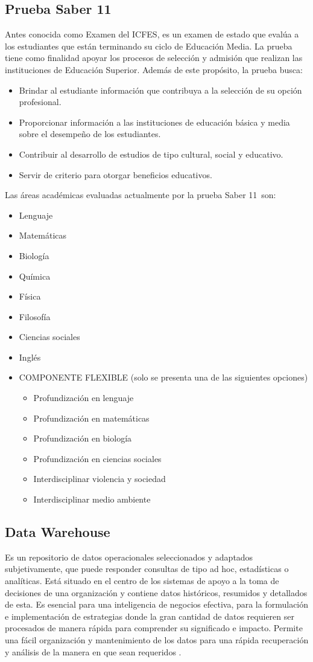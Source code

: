 \subsection{Prueba Saber 11\degree}\label{sec:saber11}
Antes conocida como Examen del ICFES, es un examen de estado que evalúa a los estudiantes que están terminando su ciclo de Educación Media. La prueba tiene como finalidad apoyar los procesos de selección y admisión que realizan las instituciones de Educación Superior. Además de este propósito, la prueba busca:
\begin{itemize}
\item Brindar al estudiante información que contribuya a la selección de
su opción profesional. 
\item Proporcionar información a las instituciones de educación básica y
media sobre el desempeño de los estudiantes. 
\item Contribuir al desarrollo de estudios de tipo cultural, social y educativo. 
\item Servir de criterio para otorgar beneficios educativos. 
\end{itemize}
Las áreas académicas evaluadas actualmente por la prueba Saber 11\degree \ son:
\begin{itemize}
\item Lenguaje 
\item Matemáticas 
\item Biología 
\item Química 
\item Física 
\item Filosofía 
\item Ciencias sociales 
\item Inglés 
\item COMPONENTE FLEXIBLE (solo se presenta una de las siguientes opciones)
\begin{itemize}
\item Profundización en lenguaje 
\item Profundización en matemáticas 
\item Profundización en biología 
\item Profundización en ciencias sociales 
\item Interdisciplinar violencia y sociedad 
\item Interdisciplinar medio ambiente
\end{itemize}
\end{itemize}
\subsection{Data Warehouse}
Es un repositorio de datos operacionales seleccionados y adaptados subjetivamente, que puede responder consultas de tipo ad hoc, estadísticas o analíticas. Está situado en el centro de los sistemas de apoyo a la toma de decisiones de una organización y contiene datos históricos, resumidos y detallados de esta. Es esencial para una inteligencia de negocios efectiva, para la formulación e implementación de estrategias donde la gran cantidad de datos requieren ser procesados de manera rápida para comprender su significado e impacto. Permite una fácil organización y mantenimiento de los datos para una rápida recuperación y análisis de la manera en que sean requeridos \cite{key-90}.
